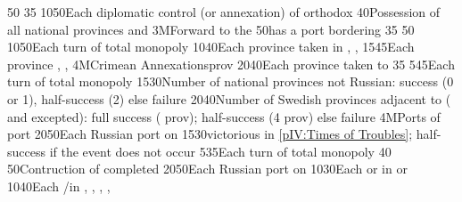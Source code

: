 {}{50}{}%
%
%
{}{35}{}%
%
%
%
{10}{50}{Each diplomatic control (or annexation) of orthodox \MIN}%
%
%
{}{40}{Possession of all national provinces and \provinceSmolenska}%
%
\EUobjective3M{Forward to the \regionBaltique}{}%
{}{50}{\paysmajeurRussie has a port bordering \regionBaltique}%
%
%
{}{35}{}%
%
%
{}{50}{}%
%
%
%
{10}{50}{Each turn of total  monopoly}%
%
%
%
{10}{40}{Each province taken in \paysmajeurPologne, \paysmajeurLithuanie,
  \paysukraine}%
%
%
{15}{45}{Each province \provinceNeva, \provinceLivonija, \provinceEstland}%
%
\EUobjective4M{Crimean Annexations}{prov}%
{20}{40}{Each province taken to \payscrimee}%
%
%
{}{35}{}%
%
%
%
{5}{45}{Each turn of total  monopoly}%
%
%
{15}{30}{Number of national provinces not Russian: success (0 or 1),
  half-success (2) else failure}%
%
%
{20}{40}{Number of Swedish provinces adjacent to \regionBaltique (\regionSuede
  and \regionFinlande excepted): full success ( prov);
  half-success (4 prov) else failure}%
%
%
\EUobjective4M{Ports of }{port}%
{20}{50}{Each Russian port on }%
%
%
{15}{30}{\RUS victorious in \ref{pIV:Times of Troubles}; half-success if the
  event does not occur}%
%
%
%
{5}{35}{Each turn of total  monopoly}%
%
%
{}{40}{}%
%
%
{}{50}{Contruction of  completed}%
%
%
{20}{50}{Each Russian port on }%
%
%
{10}{30}{Each \COL or \TP in  or }%
%
%
%
{10}{40}{Each \COL/\TP in \granderegionAmour, \granderegionBaikal,
  \granderegionAfghanistan, \granderegionPerse, \continentIndia}%
